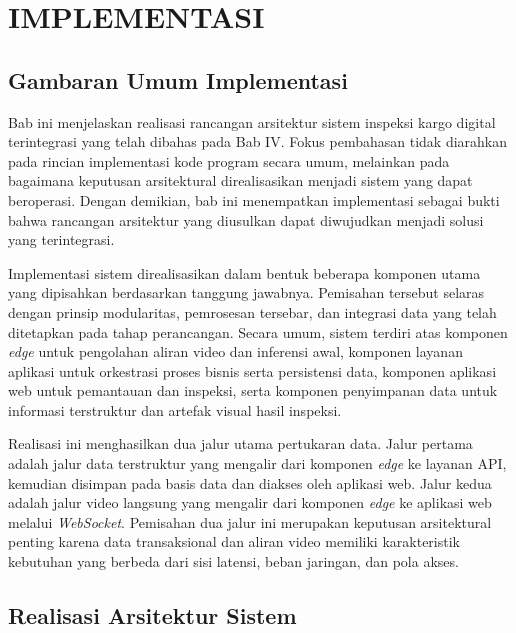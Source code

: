 \cleardoublepage
\chapter{IMPLEMENTASI}
\label{chap:implementasi}

\section{Gambaran Umum Implementasi}
\label{sec:gambaran-umum-implementasi}

Bab ini menjelaskan realisasi rancangan arsitektur sistem inspeksi kargo digital
terintegrasi yang telah dibahas pada Bab IV. Fokus pembahasan tidak diarahkan
pada rincian implementasi kode program secara umum, melainkan pada bagaimana
keputusan arsitektural direalisasikan menjadi sistem yang dapat beroperasi.
Dengan demikian, bab ini menempatkan implementasi sebagai bukti bahwa
rancangan arsitektur yang diusulkan dapat diwujudkan menjadi solusi yang
terintegrasi.

Implementasi sistem direalisasikan dalam bentuk beberapa komponen utama yang
dipisahkan berdasarkan tanggung jawabnya. Pemisahan tersebut selaras dengan
prinsip modularitas, pemrosesan tersebar, dan integrasi data yang telah
ditetapkan pada tahap perancangan. Secara umum, sistem terdiri atas komponen
\textit{edge} untuk pengolahan aliran video dan inferensi awal, komponen
layanan aplikasi untuk orkestrasi proses bisnis serta persistensi data, komponen
aplikasi web untuk pemantauan dan inspeksi, serta komponen penyimpanan data
untuk informasi terstruktur dan artefak visual hasil inspeksi.

Realisasi ini menghasilkan dua jalur utama pertukaran data. Jalur pertama adalah
jalur data terstruktur yang mengalir dari komponen \textit{edge} ke layanan API,
kemudian disimpan pada basis data dan diakses oleh aplikasi web. Jalur kedua
adalah jalur video langsung yang mengalir dari komponen \textit{edge} ke aplikasi
web melalui \textit{WebSocket}. Pemisahan dua jalur ini merupakan keputusan
arsitektural penting karena data transaksional dan aliran video memiliki
karakteristik kebutuhan yang berbeda dari sisi latensi, beban jaringan, dan pola
akses.

\section{Realisasi Arsitektur Sistem}
\label{sec:realisasi-arsitektur-sistem}

